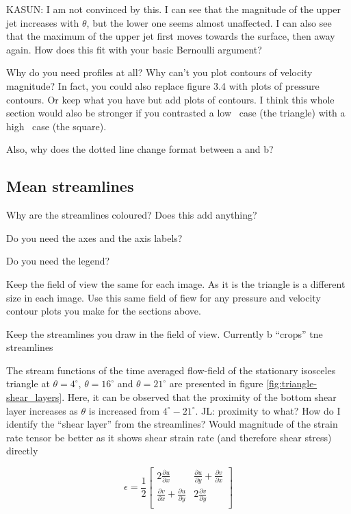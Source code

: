 KASUN: I am not convinced by this. I can see that the magnitude of the upper jet increases with $\theta$, but the lower one seems almost unaffected. I can also see that the maximum of the upper jet first moves towards the surface, then away again. How does this fit with your basic Bernoulli argument?

Why do you need profiles at all? Why can't you plot contours of velocity magnitude? In fact, you could also replace figure 3.4 with plots of pressure contours. Or keep what you have but add plots of contours. I think this whole section would also be stronger if you contrasted a low \ratio\ case (the triangle) with a high \ratio\ case (the square).

Also, why does the dotted line change format between a and b?


\subsection{Mean streamlines}



Why are the streamlines coloured? Does this add anything?

Do you need the axes and the axis labels?

Do you need the legend?

Keep the field of view the same for each image. As it is the triangle
is a different size in each image. Use this same field of fiew for any pressure and velocity contour plots you make for the sections above.

Keep the streamlines you draw in the field of view. Currently b ``crops'' tne streamlines

The stream functions of the time averaged flow-field of the stationary isosceles triangle at  $\theta=4^{\circ}$, $\theta=16^{\circ}$ and $\theta=21^{\circ}$ are presented in figure \ref{fig:triangle-shear_layers}. Here, it can be observed that the proximity of the bottom shear layer increases as $\theta$ is increased from $4^{\circ}-21^{\circ}$. JL: proximity to what? How do I identify the ``shear layer'' from the streamlines? Would magnitude of the strain rate tensor be better as it shows shear strain rate (and therefore shear stress) directly

\begin{equation}
\epsilon = \frac{1}{2}
\begin{bmatrix}
  2\frac{\partial u}{\partial x} & \frac{\partial u}{\partial y} + \frac{\partial v}{\partial x} \\
  \frac{\partial v}{\partial x} + \frac{\partial u}{\partial y} & 2\frac{\partial v}{\partial y} \\
\end{bmatrix}
\end{equation}

